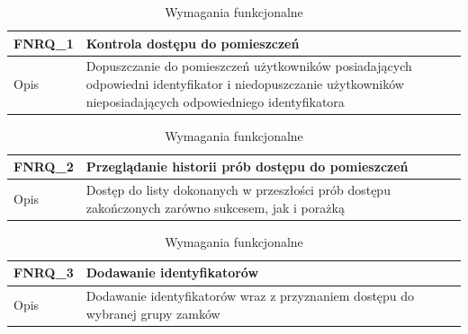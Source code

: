         \begin{table}[h!]
            \caption{Wymagania funkcjonalne}
            \centering
            \begin{subtable}[c]{\textwidth}
                \centering
                \begin{tabular}{|p{2cm}|p{12cm}|}
                    \hline FNRQ\_1      & \textbf{Kontrola dostępu do pomieszczeń}  \\
                    \hline \cellcolor[gray]{0.8} Opis         & Dopuszczanie do pomieszczeń użytkowników posiadających odpowiedni identyfikator i niedopuszczanie użytkowników nieposiadających odpowiedniego identyfikatora  \\
                    \hline
                \end{tabular}
                \label{tbl:fnrq1}
                \vspace{10mm}           
            \end{subtable}
        \quad%
            \begin{subtable}[c]{\textwidth}
                \centering
                 \begin{tabular}{|p{2cm}|p{12cm}|}
                    \hline FNRQ\_2      & \textbf{Przeglądanie historii prób dostępu do pomieszczeń}  \\
                    \hline \cellcolor[gray]{0.8} Opis         & Dostęp do listy dokonanych w przeszłości prób dostępu zakończonych zarówno sukcesem, jak i porażką \\
                    \hline
                \end{tabular}
                \label{tbl:fnrq2}
                \vspace{10mm}           
            \end{subtable}
            \begin{subtable}[c]{\textwidth}
                \centering
                 \begin{tabular}{|p{2cm}|p{12cm}|}
                    \hline FNRQ\_3      & \textbf{Dodawanie identyfikatorów}  \\
                    \hline \cellcolor[gray]{0.8} Opis         & Dodawanie identyfikatorów wraz z przyznaniem dostępu do wybranej grupy zamków \\
                    \hline
                \end{tabular}
                \label{tbl:fnrq3}
                \vspace{10mm}           
            \end{subtable}
        \label{tbl:fnrq}
        \end{table}
    
